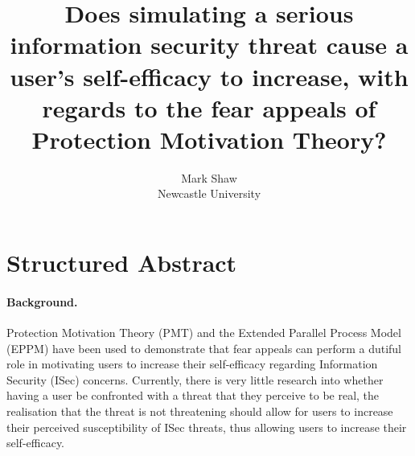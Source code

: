 \documentclass[letterpaper,twocolumn,10pt]{article}
\begin{document}
\date{}




\title{\Large \bf Does simulating a serious information security threat cause a user's self-efficacy to increase, with regards to the fear appeals of Protection Motivation Theory? }

\author{
Mark Shaw\\
Newcastle University
} %

\maketitle



\section{Structured Abstract}
 \label{sec:abstract}

\paragraph{Background.} 
Protection Motivation Theory (PMT) and the Extended Parallel Process Model (EPPM) have been used to demonstrate that fear appeals can perform a dutiful role in motivating users to increase their self-efficacy regarding Information Security (ISec) concerns. Currently, there is very little research into whether having a user be confronted with a threat that they perceive to be real, the realisation that the threat is not threatening should allow for users to increase their perceived susceptibility of ISec threats, thus allowing users to increase their self-efficacy. 
\end{document}
